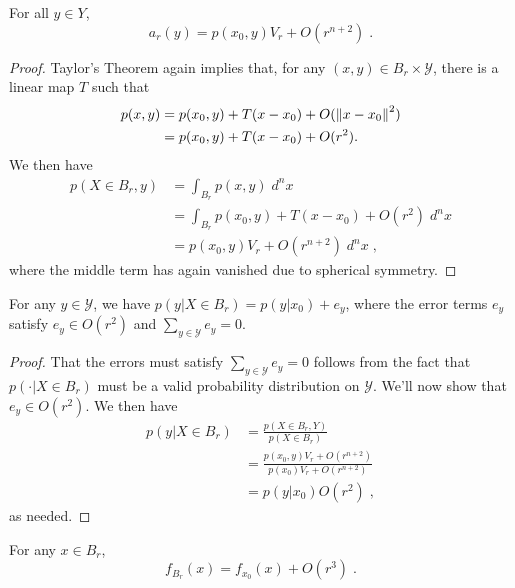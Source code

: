 \documentclass[english]{scrartcl}
\begin{document}
	\begin{lm}
		For all $y\in Y$,
		\begin{equation*}
			a_r(y) = p(x_0,y)V_r + O(r^{n+2})\;.
		\end{equation*}
	\end{lm}
	\begin{proof}
		Taylor's Theorem again implies that, for any $(x,y)\in B_r \times \mathcal{Y}$, there is a linear map $T$ such that
		\begin{align*}
			p(x,y) &= p(x_0,y) + T(x - x_0) + O(\left\lVert x - x_0\right\rVert^2) \\
			&= p(x_0,y) + T(x - x_0) + O(r^2). 
		\end{align*}
		We then have 
		\begin{align*}
			p(X \in B_r, y) &= \int_{B_r} p(x,y) \; d^n x \\ 
			&= \int_{B_r} p(x_0,y) + T(x - x_0) + O(r^2) \; d^n x \\
			&= p(x_0,y)V_r + O(r^{n+2}) \; d^n x\;,
		\end{align*}
		where the middle term has again vanished due to spherical symmetry. 
	\end{proof}
	\begin{lm}
		For any $y \in \mathcal{Y}$, we have $p(y|X \in B_r) = p(y|x_0) + e_y$, where the error terms $e_y$ satisfy $e_y \in O(r^2)$ and $\sum_{y \in \mathcal{Y}} e_y = 0$. 
	\end{lm}
	\begin{proof}
		That the errors must satisfy $\sum_{y \in \mathcal{Y}} e_y = 0$ follows from the fact that $p(\cdot| X \in B_r)$ must be a valid probability distribution on $\mathcal{Y}$. We'll now show that $e_y \in O(r^2)$. We then have 
		\begin{align*}
			p(y|X \in B_r) &= \frac{p(X \in B_r, Y)}{p(X\in B_r)} \\
			&= \frac{p(x_0, y)V_r + O(r^{n+2})}{p(x_0)V_r + O(r^{n+2})} \\
			&= p(y|x_0)  O(r^{2}) \tag{$V_r \propto r^n$}\;,
		\end{align*}
		as needed. 
	\end{proof}
	\begin{lm}
		For any $x \in B_r$, 
		\begin{equation*}
			f_{B_r}(x) = f_{x_0}(x) + O(r^3)\;.
		\end{equation*}
	\end{lm}
\end{document}
